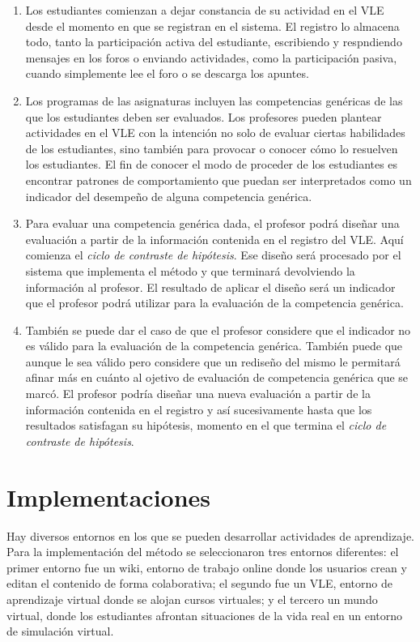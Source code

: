 \begin{enumerate}
\item Los estudiantes comienzan a dejar constancia de su actividad en el VLE desde el momento en que se registran en el sistema. El registro lo almacena todo, tanto la participación activa del estudiante, escribiendo y respndiendo mensajes en los foros o enviando actividades, como la participación pasiva, cuando simplemente lee el foro o se descarga los apuntes. 
\item Los programas de las asignaturas incluyen las competencias genéricas de las que los estudiantes deben ser evaluados. Los profesores pueden plantear actividades en el VLE con la intención no solo de evaluar ciertas habilidades de los estudiantes, sino también para provocar o conocer cómo lo resuelven los estudiantes. El fin de conocer el modo de proceder de los estudiantes es encontrar patrones de comportamiento que puedan ser interpretados como un indicador del desempeño de alguna competencia genérica.
\item Para evaluar una competencia genérica dada, el profesor podrá diseñar una evaluación a partir de la información contenida en el registro del VLE. Aquí comienza el  \emph{ciclo de contraste de hipótesis}. Ese diseño será procesado por el sistema que implementa el método y que terminará devolviendo la información al profesor. El resultado de aplicar el diseño será un indicador que el profesor podrá utilizar para la evaluación de la competencia genérica.
\item También se puede dar el caso de que el profesor considere que el indicador no es válido para la evaluación de la competencia genérica. También puede que aunque le sea válido pero considere que un rediseño del mismo le permitará afinar más en cuánto al ojetivo de evaluación de competencia genérica que se marcó. El profesor podría diseñar una nueva evaluación a partir de la información contenida en el registro y así sucesivamente hasta que los resultados satisfagan su hipótesis, momento en el que termina el  \emph{ciclo de contraste de hipótesis}.
\end{enumerate}

\section{Implementaciones}

Hay diversos entornos en los que se pueden desarrollar actividades de aprendizaje. Para la implementación del método se seleccionaron tres entornos diferentes: el primer entorno fue un wiki, entorno de trabajo online donde los usuarios crean y editan el contenido de forma colaborativa; el segundo fue un VLE, entorno de aprendizaje virtual donde se alojan cursos virtuales; y el tercero un mundo virtual, donde los estudiantes afrontan situaciones de la vida real en un entorno de simulación virtual.

